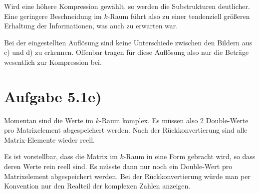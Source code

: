 Wird eine höhere Kompression gewählt, so werden die Substrukturen deutlicher.
Eine geringere Beschneidung im $k$-Raum führt also zu einer tendenziell größeren
Erhaltung der Informationen, was auch zu erwarten war.

Bei der eingestellten Auflösung sind keine Unterschiede zwischen den Bildern aus c) und d) zu
erkennen. Offenbar tragen für diese Auflösung also nur die Beträge wesentlich zur Kompression bei.

\section*{Aufgabe 5.1e)}

Momentan sind die Werte im $k$-Raum komplex. Es müssen also 2 Double-Werte pro Matrixelement
abgespeichert werden. Nach der Rückkonvertierung sind alle Matrix-Elemente wieder reell.

Es ist vorstellbar, dass die Matrix im $k$-Raum in eine Form gebracht wird, so dass deren Werte
rein reell sind. Es müsste dann nur noch ein Double-Wert pro Matrixelement abgespeichert werden.
Bei der Rückkonvertierung würde man per Konvention nur den Realteil der komplexen
Zahlen anzeigen.